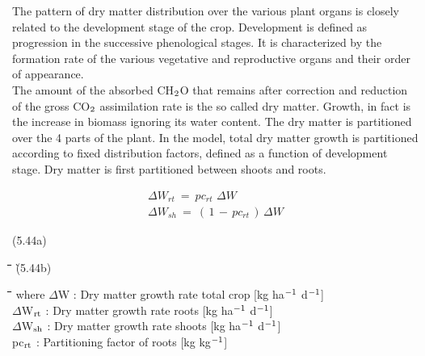 The pattern of dry matter distribution over the various plant organs is closely related to
the development stage of the crop. Development is defined as progression in the success\-ive {\nobreak}phenological stages. It is characterized by the formation rate of the various vegetative
and reproductive organs and their order of appearance.\\
The amount of the absorbed CH$_{{\rm 2}}$O that remains after correction and reduction of the
gross CO$_{{\rm 2}}$ assimilation rate is the so called dry matter. Growth, in fact is the increase in
biomass ignoring its water content. The dry matter is partitioned over the 4 parts of the
plant. In the model, total dry matter growth is parti\-tioned according to fixed distribution
factors, defined as a function of develop\-ment stage. Dry matter is first partitioned
between shoots and roots. 

\begin{eqnarray*}
\Delta W _{rt} ~=~ pc _{rt} \,\,\Delta W   \nonumber  \\
\Delta W _{sh} ~=~ (\, 1\, -\, pc _{rt} \, )\,\Delta W
\end{eqnarray*}

 
\strut\hfill (5.44a)\nwln
\begin{tabbing}
\hspace{1.27cm}\=\hspace{1.27cm}\=\hspace{1.27cm}\=\hspace{1.27cm}\=%
\hspace{1.27cm}\=\hspace{1.27cm}\=\hspace{1.27cm}\=\hspace{1.27cm}\=%
\hspace{1.27cm}\=\hspace{1.27cm}\=\kill
   \`(5.44b)
\end{tabbing}
\nwln
\begin{tabbing}
\hspace{1.27cm}\=\hspace{1.27cm}\=\hspace{1.27cm}\=\hspace{1.27cm}\=%
\hspace{1.27cm}\=\hspace{1.27cm}\=\hspace{1.27cm}\=\hspace{1.27cm}\=%
\hspace{1.27cm}\=\hspace{1.27cm}\=\kill
where $\Delta$W : Dry matter growth rate total crop        [kg ha$^{{\rm -1}}$ d$^{{\rm -1}}$]\\
$\Delta$W$_{{\rm rt}}$ : Dry matter growth rate roots        [kg ha$^{{\rm -1}}$ d$^{{\rm -1}}$]\\
$\Delta$W$_{{\rm sh}}$ : Dry matter growth rate shoots        [kg ha$^{{\rm -1}}$ d$^{{\rm -1}}$]\\
pc$_{{\rm rt}}$ : Parti\-tioning factor of roots        [kg kg$^{{\rm -1}}$]
\end{tabbing}



